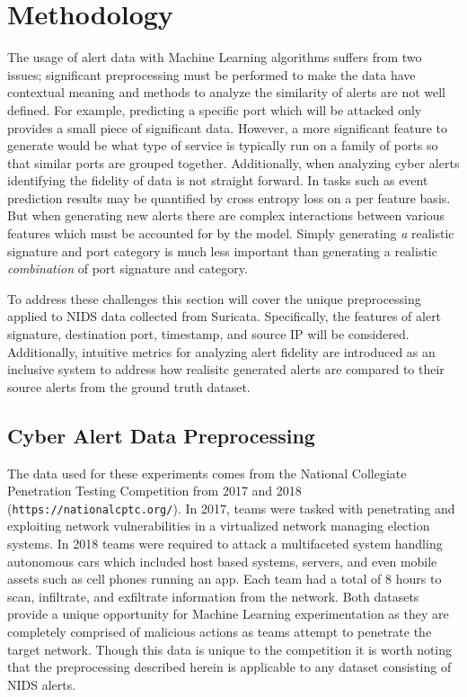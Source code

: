 \chapter{Methodology}
\label{sec:meth}

The usage of alert data with Machine Learning algorithms suffers from two issues; significant preprocessing must be performed to make the data have contextual meaning and methods to analyze the similarity of alerts are not well defined. For example, predicting a specific port which will be attacked only provides a small piece of significant data. However, a more significant feature to generate would be what type of service is typically run on a family of ports so that similar ports are grouped together. Additionally, when analyzing cyber alerts identifying the fidelity of data is not straight forward. In tasks such as event prediction results may be quantified by cross entropy loss on a per feature basis. But when generating new alerts there are complex interactions between various features which must be accounted for by the model. Simply generating \emph{a} realistic signature and port category is much less important than generating a realistic \emph{combination} of port signature and category. 

To address these challenges this section will cover the unique preprocessing applied to NIDS data collected from Suricata. Specifically, the features of alert signature, destination port, timestamp, and source IP will be considered. Additionally, intuitive metrics for analyzing alert fidelity are introduced as an inclusive system to address how realisitc generated alerts are compared to their source alerts from the ground truth dataset. 

\section{Cyber Alert Data Preprocessing}


The data used for these experiments comes from the National Collegiate Penetration Testing Competition from 2017 and 2018 (\texttt{https://nationalcptc.org/}). In 2017, teams were tasked with penetrating and exploiting network vulnerabilities in a virtualized network managing election systems. In 2018 teams were required to attack a multifaceted system handling autonomous cars which included host based systems, servers, and even mobile assets such as cell phones running an app. Each team had a total of 8 hours to scan, infiltrate, and exfiltrate information from the network. Both datasets provide a unique opportunity for Machine Learning experimentation as they are completely comprised of malicious actions as teams attempt to penetrate the target network. Though this data is unique to the competition it is worth noting that the preprocessing described herein is applicable to any dataset consisting of NIDS alerts.  

